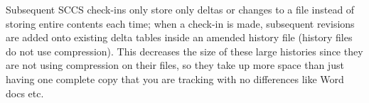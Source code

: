 Subsequent SCCS check-ins only store only deltas or changes to a file instead of storing entire contents each time; when a check-in is made, subsequent revisions are added onto existing delta tables inside an amended history file (history files do not use compression). This decreases the size of these large histories since they are not using compression on their files, so they take up more space than just having one complete copy that you are tracking with no differences like Word docs etc.







